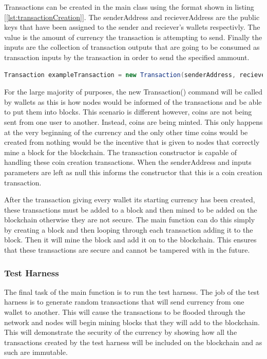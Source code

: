 \documentclass{l4proj}
\begin{document}
Transactions can be created in the main class using the
format shown in listing [\ref{lst:transactionCreation}]. The senderAddress and recieverAddress are the public keys
that have been assigned to the sender and reciever's wallets respectivly. The value is the amount of currency the
transaction is attempting to send. Finally the inputs are the collection of transaction outputs that are going
to be consumed as transaction inputs by the transaction in order to send the specified ammount.

\begin{lstlisting}[language=java, float=h, caption={This code snippet shows how transactions are created using
    the address of the sender, the address of the reciever, the value of the transaction, and the transaction
    inputs that are to be consumed by the transaction.}, label=lst:transactionCreation]
    Transaction exampleTransaction = new Transaction(senderAddress, recieverAddress, value, inputs);
\end{lstlisting}

For the large majority of purposes, the new Transaction() command will be called by wallets as this is how nodes
would be informed of the transactions and be able to put them into blocks. This scenario is different however, coins
are not being sent from one user to another. Instead, coins are being minted. This only happens at the very beginning
of the currency and the only other time coins would be created from nothing would be the incentive that is given
to nodes that correctly mine a block for the blockchain. The transaction constructor is capable of handling these
coin creation transactions. When the senderAddress and inputs parameters are left as null this informs the 
constructor that this is a coin creation transaction.

After the transaction giving every wallet its starting currency has been created, these transactions must be
added to a block and then mined to be added on the blockchain otherwise they are not secure. The main function
can do this simply by creating a block and then looping through each transaction adding it to the block. Then it will
mine the block and add it on to the blockchain. This ensures that these transactions are secure and cannot be tampered
with in the future.

\subsubsection{Test Harness}
The final task of the main function is to run the test harness. The job of the test harness is to generate 
random transactions that will send currency from one wallet to another. This will cause the transactions to 
be flooded through the network and nodes will begin mining blocks that they will add to the blockchain. This will
demonstrate the security of the currency by showing how all the transactions created by the test harness will
be included on the blockchain and as such are immutable.
\end{document}
